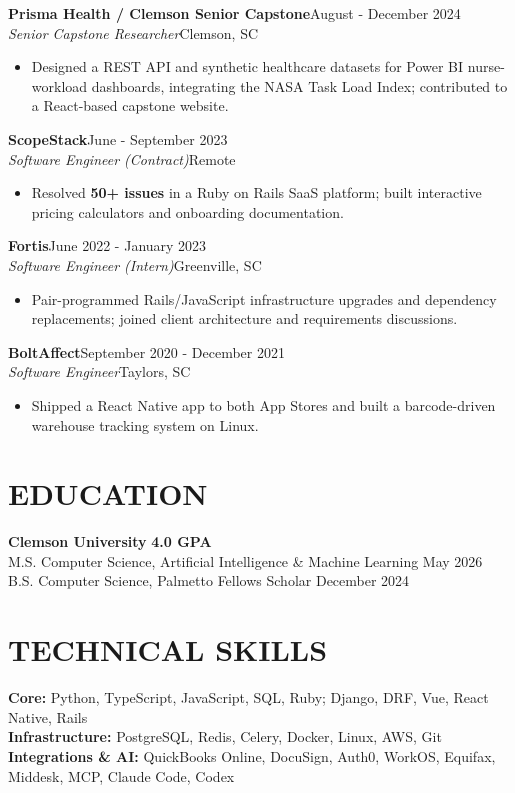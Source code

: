 \documentclass[10pt,letterpaper]{article}
\newcommand{\role}[4]{\vspace{5pt}\textbf{#1}\hfill{\small #2}\\\textit{#3}\hfill{\small\color{muted}#4}}
\begin{document}
\role{Prisma Health / Clemson Senior Capstone}{August - December 2024}{Senior Capstone Researcher}{Clemson, SC}
\begin{itemize}
\item Designed a REST API and synthetic healthcare datasets for Power BI nurse-workload dashboards, integrating the NASA Task Load Index; contributed to a React-based capstone website.
\end{itemize}
\role{ScopeStack}{June - September 2023}{Software Engineer (Contract)}{Remote}
\begin{itemize}
\item Resolved \textbf{50+ issues} in a Ruby on Rails SaaS platform; built interactive pricing calculators and onboarding documentation.
\end{itemize}
\role{Fortis}{June 2022 - January 2023}{Software Engineer (Intern)}{Greenville, SC}
\begin{itemize}
\item Pair-programmed Rails/JavaScript infrastructure upgrades and dependency replacements; joined client architecture and requirements discussions.
\end{itemize}
\role{BoltAffect}{September 2020 - December 2021}{Software Engineer}{Taylors, SC}
\begin{itemize}
\item Shipped a React Native app to both App Stores and built a barcode-driven warehouse tracking system on Linux.
\end{itemize}
\section*{EDUCATION}
\textbf{Clemson University} \hfill \textbf{4.0 GPA}\\
M.S. Computer Science, Artificial Intelligence \& Machine Learning \hfill May 2026\\
B.S. Computer Science, Palmetto Fellows Scholar \hfill December 2024
\section*{TECHNICAL SKILLS}
\textbf{Core:} Python, TypeScript, JavaScript, SQL, Ruby; Django, DRF, Vue, React Native, Rails\\
\textbf{Infrastructure:} PostgreSQL, Redis, Celery, Docker, Linux, AWS, Git\\
\textbf{Integrations \& AI:} QuickBooks Online, DocuSign, Auth0, WorkOS, Equifax, Middesk, MCP, Claude Code, Codex
\end{document}
